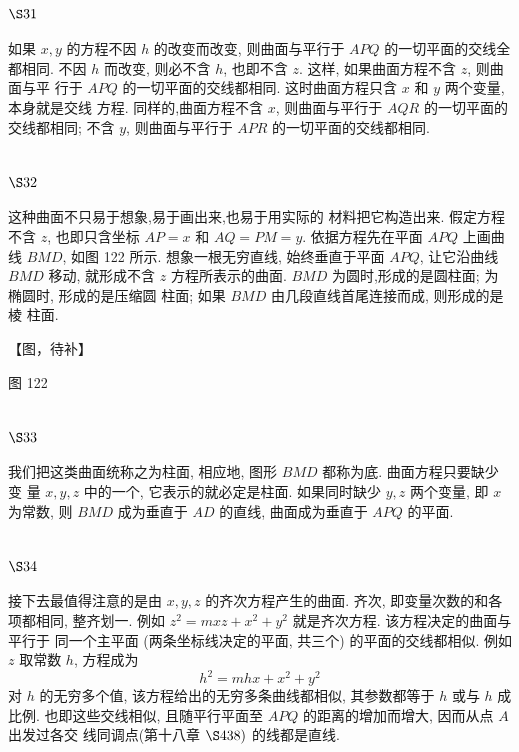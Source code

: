 \section{$\S 31$}

如果 $x, y$ 的方程不因 $h$ 的改变而改变, 则曲面与平行于 $A P Q$ 的一切平面的交线全 都相同. 不因 $h$ 而改变, 则必不含 $h$, 也即不含 $z$. 这样, 如果曲面方程不含 $z$, 则曲面与平 行于 $A P Q$ 的一切平面的交线都相同. 这时曲面方程只含 $x$ 和 $y$ 两个变量, 本身就是交线 方程. 同样的,曲面方程不含 $x$, 则曲面与平行于 $A Q R$ 的一切平面的交线都相同; 不含 $y$, 则曲面与平行于 $A P R$ 的一切平面的交线都相同.

\section{$\S 32$}

这种曲面不只易于想象,易于画出来,也易于用实际的 材料把它构造出来. 假定方程不含 $z$, 也即只含坐标 $A P=x$ 和 $A Q=P M=y$. 依据方程先在平面 $A P Q$ 上画曲线 $B M D$, 如图 122 所示. 想象一根无穷直线, 始终垂直于平面 $A P Q$, 让它沿曲线 $B M D$ 移动, 就形成不含 $z$ 方程所表示的曲面. $B M D$ 为圆时,形成的是圆柱面; 为椭圆时, 形成的是压缩圆 柱面; 如果 $B M D$ 由几段直线首尾连接而成, 则形成的是棱 柱面.


【图，待补】

图 122

\section{$\S 33$}

我们把这类曲面统称之为柱面, 相应地, 图形 $B M D$ 都称为底. 曲面方程只要缺少变 量 $x, y, z$ 中的一个, 它表示的就必定是柱面. 如果同时缺少 $y, z$ 两个变量, 即 $x$ 为常数, 则 $B M D$ 成为垂直于 $A D$ 的直线, 曲面成为垂直于 $A P Q$ 的平面.

\section{$\S 34$}

接下去最值得注意的是由 $x, y, z$ 的齐次方程产生的曲面. 齐次, 即变量次数的和各 项都相同, 整齐划一. 例如 $z^{2}=m x z+x^{2}+y^{2}$ 就是齐次方程. 该方程决定的曲面与平行于 同一个主平面 (两条坐标线决定的平面, 共三个) 的平面的交线都相似. 例如 $z$ 取常数 $h$, 方程成为
\[
h^{2}=m h x+x^{2}+y^{2}
\]
对 $h$ 的无穷多个值, 该方程给出的无穷多条曲线都相似, 其参数都等于 $h$ 或与 $h$ 成比例. 也即这些交线相似, 且随平行平面至 $A P Q$ 的距离的增加而增大, 因而从点 $A$ 出发过各交 线同调点(第十八章 $\S 438)$ 的线都是直线.

